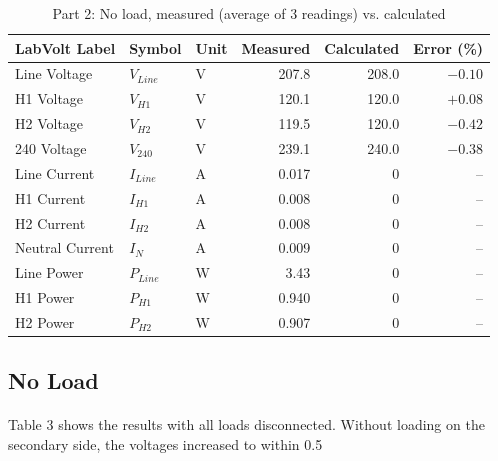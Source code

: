 \begin{table}[htbp]
	\centering
	\caption{Part 2: No load, measured (average of 3 readings) vs. calculated}
	\label{tab:part2noload}
	\begin{tabular}{lllrrr}
		\toprule
		\textbf{LabVolt Label} & \textbf{Symbol} & \textbf{Unit} & \textbf{Measured} & \textbf{Calculated} & \textbf{Error (\%)} \\
		\midrule
		Line Voltage           & $V_{Line}$      & V             & 207.8             & 208.0               & $-0.10$             \\
		H1 Voltage             & $V_{H1}$        & V             & 120.1             & 120.0               & $+0.08$             \\
		H2 Voltage             & $V_{H2}$        & V             & 119.5             & 120.0               & $-0.42$             \\
		240 Voltage            & $V_{240}$       & V             & 239.1             & 240.0               & $-0.38$             \\
		Line Current           & $I_{Line}$      & A             & 0.017             & 0                   & --                  \\
		H1 Current             & $I_{H1}$        & A             & 0.008             & 0                   & --                  \\
		H2 Current             & $I_{H2}$        & A             & 0.008             & 0                   & --                  \\
		Neutral Current        & $I_{N}$         & A             & 0.009             & 0                   & --                  \\
		Line Power             & $P_{Line}$      & W             & 3.43              & 0                   & --                  \\
		H1 Power               & $P_{H1}$        & W             & 0.940             & 0                   & --                  \\
		H2 Power               & $P_{H2}$        & W             & 0.907             & 0                   & --                  \\
		\bottomrule
	\end{tabular}
\end{table}
%
\subsection{No Load}
\paragraph{}Table 3 shows the results with all loads disconnected. Without loading on the secondary side, the voltages increased to within 0.5%

